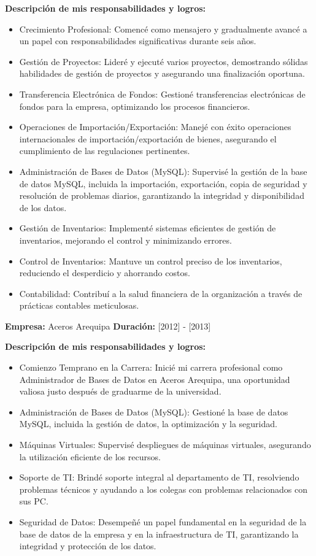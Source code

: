 \documentclass[a4paper,10pt]{article}
\begin{document}
\textbf{Descripción de mis responsabilidades y logros:}
\begin{itemize}
    \item Crecimiento Profesional: Comencé como mensajero y gradualmente avancé a un papel con responsabilidades significativas durante seis años.
    \item Gestión de Proyectos: Lideré y ejecuté varios proyectos, demostrando sólidas habilidades de gestión de proyectos y asegurando una finalización oportuna.
    \item Transferencia Electrónica de Fondos: Gestioné transferencias electrónicas de fondos para la empresa, optimizando los procesos financieros.
    \item Operaciones de Importación/Exportación: Manejé con éxito operaciones internacionales de importación/exportación de bienes, asegurando el cumplimiento de las regulaciones pertinentes.
    \item Administración de Bases de Datos (MySQL): Supervisé la gestión de la base de datos MySQL, incluida la importación, exportación, copia de seguridad y resolución de problemas diarios, garantizando la integridad y disponibilidad de los datos.
    \item Gestión de Inventarios: Implementé sistemas eficientes de gestión de inventarios, mejorando el control y minimizando errores.
    \item Control de Inventarios: Mantuve un control preciso de los inventarios, reduciendo el desperdicio y ahorrando costos.
    \item Contabilidad: Contribuí a la salud financiera de la organización a través de prácticas contables meticulosas.
\end{itemize}

\textbf{Empresa:} Aceros Arequipa  
\textbf{Duración:} [2012] - [2013]

\textbf{Descripción de mis responsabilidades y logros:}
\begin{itemize}
    \item Comienzo Temprano en la Carrera: Inicié mi carrera profesional como Administrador de Bases de Datos en Aceros Arequipa, una oportunidad valiosa justo después de graduarme de la universidad.
    \item Administración de Bases de Datos (MySQL): Gestioné la base de datos MySQL, incluida la gestión de datos, la optimización y la seguridad.
    \item Máquinas Virtuales: Supervisé despliegues de máquinas virtuales, asegurando la utilización eficiente de los recursos.
    \item Soporte de TI: Brindé soporte integral al departamento de TI, resolviendo problemas técnicos y ayudando a los colegas con problemas relacionados con sus PC.
    \item Seguridad de Datos: Desempeñé un papel fundamental en la seguridad de la base de datos de la empresa y en la infraestructura de TI, garantizando la integridad y protección de los datos.
\end{itemize}
\end{document}
